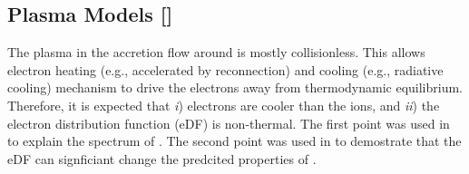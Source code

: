 \documentclass[twocolumn,tighten,dvipsnames,linenumbers]{aastex63}
\newcommand\ckc[1]{{\color{MidnightBlue}[ckc: #1]}}
\begin{document}



\subsection{Plasma Models
  []}
\label{sec:eDF}

The plasma in the accretion flow around \sgra is mostly collisionless.
This allows electron heating (e.g., accelerated by reconnection) and
cooling (e.g., radiative cooling) mechanism to drive the electrons
away from thermodynamic equilibrium.
Therefore, it is expected that \emph{i}) electrons are cooler than the
ions, and \emph{ii}) the electron distribution function (eDF) is
non-thermal.
The first point was used in \citet{1998ApJ...492..554N} to explain the
spectrum of \sgra.
The second point was used in \citep{2000ApJ...541..234O} to demostrate
that the eDF can signficiant change the predcited properties of \sgra.
\end{document}
